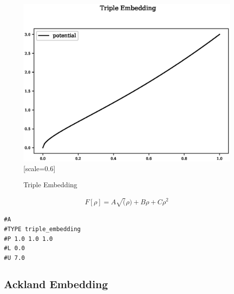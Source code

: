 \documentclass[12pt,twoside]{manual}
\begin{document}
\begin{appendices}
\begin{figure}[h]
  \begin{center}
    \includegraphics{img/plots/triple_embedding.eps}[scale=0.6]
    \caption{Triple Embedding}
    \label{graph:graph1}
  \end{center}
\end{figure}

\begin{equation}
\begin{split}
F[\rho] = A \sqrt(\rho) + B \rho + C \rho^2
\end{split}
\label{eq:tripleEmbedding}
\end{equation}

\begin{lstlisting}[style=pseudocode,caption={Triple Embedding}]
#A
#TYPE triple_embedding
#P 1.0 1.0 1.0
#L 0.0
#U 7.0
\end{lstlisting}



\subsection{Ackland Embedding}


\end{appendices}
\end{document}
